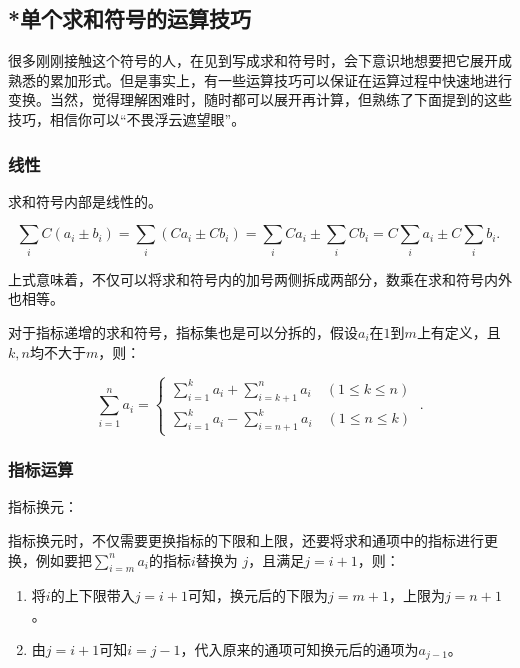 \subsection{*单个求和符号的运算技巧}

很多刚刚接触这个符号的人，在见到写成求和符号时，会下意识地想要把它展开成熟悉的累加形式。但是事实上，有一些运算技巧可以保证在运算过程中快速地进行变换。当然，觉得理解困难时，随时都可以展开再计算，但熟练了下面提到的这些技巧，相信你可以“不畏浮云遮望眼”。

\subsubsection{线性}

求和符号内部是线性的。

\begin{equation}
\sum_{i} C(a_i \pm b_i) = \sum_{i} (Ca_i \pm Cb_i) =\sum_{i} Ca_i \pm \sum_{i} Cb_i=C\sum_{i} a_i \pm C\sum_{i} b_i.~
\end{equation}

上式意味着，不仅可以将求和符号内的加号两侧拆成两部分，数乘在求和符号内外也相等。

对于指标递增的求和符号，指标集也是可以分拆的，假设$a_i$在$1$到$m$上有定义，且$k,n$均不大于$m$，则：

\begin{equation}
\sum_{i=1}^n a_i  = \begin{cases}
\sum\limits_{i=1}^k a_i  +\sum\limits_{i=k+1}^n a_i \quad(1\leq k\leq n) \\
\sum\limits_{i=1}^k a_i  -\sum\limits_{i=n+1}^k a_i \quad(1\leq n\leq k) 
\end{cases} ~.
\end{equation}

\subsubsection{指标运算}

指标换元：

指标换元时，不仅需要更换指标的下限和上限，还要将求和通项中的指标进行更换，例如要把$\sum\limits_{i=m}^n a_i$的指标$i$替换为 $j$，且满足$j=i+1$，则：

\begin{enumerate}
\item 将$i$的上下限带入$j=i+1$可知，换元后的下限为$j=m+1$，上限为$j=n+1$。
\item 由$j=i+1$可知$i=j-1$，代入原来的通项可知换元后的通项为$a_{j-1}$。
\end{enumerate}

